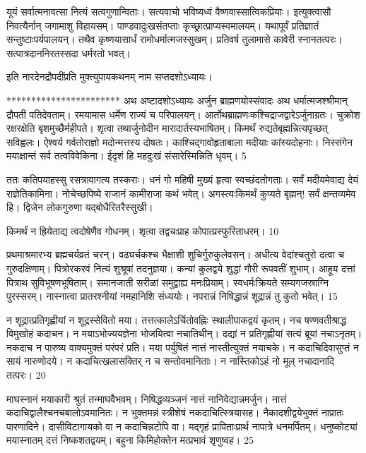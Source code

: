 यूयं सर्वात्मनावत्सा नित्यं सत्वगुणान्विताः।
सत्यवाचो भविष्यध्वं वैष्णवास्सात्विकप्रियाः।
इत्युक्त्वासौ निवत्यैर्नान् जगामाशु विहायसम्।
पाण्डवादुःखसंतप्ताः कृच्छ्रात्प्राप्यस्वमालयम्।
यथापूर्वं प्रतिज्ञातं सन्तुष्टाःपर्यपालयन्।
तथैव कृष्णयासार्धं रामोधर्मात्मजस्सुखम्।
प्रतिवर्ष तुलामासे कावेरी स्नानतत्परः।
सत्पात्रदाननिरतस्सदा धर्मरतो भवत्।

इति नारदेनद्रौपदींप्रति मुक्त्युपायकथनम् नाम
सप्तदशोऽध्यायः।

***********************
अथ अष्टादशोऽध्यायः
अर्जुन ब्राह्मणयोस्संवादः अथ धर्मात्मजश्श्रीमान् द्रौपती पतिदेवताम्।
रमयामास धर्मेण राज्यं च परिपालयन्।
आर्तोथब्राह्मणःकश्चिद्राजद्वारेऽर्जुनाग्रतः।
चुक्रोश रक्षरक्षेति बृशमुच्छैर्महीपते।
शृत्वा तथार्जुनोदीन मारादार्तस्यभाषितम्।
किमर्थं रुद्यतेबृह्मन्नित्यपृच्छत् सविह्वलः।
ऐश्वर्य गर्वतोराज्ञो मदोन्मत्तस्य दोषतः।
काश्चिद्गावोहृताबाला मदीयाः कांस्यदोहनाः।
निस्संगेन मयाक्षान्तं सर्व तत्वविवेकिना।
ईदृशं हि महदुःखं संसारेस्मिन्निति धृवम्।
5

ततः कतिपयाहस्सु रसत्रावागत्य तस्कराः।
धनं गो महिषी मुख्यं हृत्वा स्वच्छंदतोगताः।
सर्वं मदीयमेवाद्य देयं राज्ञेतिकामिना।
नोचेच्छपिष्ये राजानं कामीराजा कथं भवेत्।
अगस्त्यःकिमर्थं कुप्यते बृह्मन्! सर्वं क्षन्तव्यमेव हि।
द्विजेन लोकगुरुणा यद्बोधैरितरैस्सुखी।

किमर्थं न ह्रियेताद्य त्वदोषेणैव गोधनम्।
शृत्वा तद्वचःप्राह कोपात्प्रस्फुरिताधरम्।
10

प्रथमाश्रमारभ्य ब्रह्मचर्यव्रतं चरन्।
वढ्यर्चकश्च भैक्षाशी शुचिर्गुरुकुलेवसन्।
अधीत्य वेदांश्चतुरो दत्वा च गुरुदक्षिणाम्।
पित्रोरकरवं नित्यं शुश्रूषां तदनुज्ञया।
कन्यां कुलद्वये शुद्धां गौरी रूपवतीं शुभाम्।
आहूय दत्तां पित्राथ सुविभूषणभूषिताम्।
समानजाती सरीळां समुद्वाह्य मनःप्रियाम्।
स्वधर्मःक्रियते सम्यगजस्राग्नि पुरस्सरम्।
नास्नात्वा प्रातरश्नीयां नमहानिशि संध्ययोः।
नपरान्नं निषिद्धान्नं शूद्रान्नं तु कुतो भवेत्।
15

न शूद्रात्प्रतिगृह्णीयां न शूद्रस्सेवितो मया।
तत्तत्कालेऽर्चितोवह्निः स्थालीपाकद्वयं कृतम्।
नच षण्णवतीश्राद्ध विमुखोहं कदाचन।
न मयाऽभोज्ययज्ञेना भोजयित्वा नचातिथीन्।
दद्यां न प्रतिगृह्णीयां सत्यं ब्रूयां नचाऽनृतम्।
नकदाच न पारुष्य वाक्यमुक्तं परंपरं प्रति।
मया पर्युषितं नात्तं नास्तीत्युक्तं नयाचके।
न कदाचिदिवासुप्तं न सायं नारुणोदये।
न कदाचित्खलासक्तिर् न च सन्तोवमानिताः।
न नास्तिकोऽहं नो मूल् नचादानादि तत्परः।
20


माघस्नानं मयाकारी श्रुतं तन्माघवैभवम्।
निषिद्धव्यञ्जनं नात्तं नानिवेद्यान्नमर्जुन।
नात्तं कदाचिद्वालैश्चनचबालोऽवमानितः।
न भुक्तमन्नं स्त्रीशेषं नकदाचित्स्त्रियासह।
नैकादशीद्वयेभुक्तं नाप्रातः पारणादिने।
दासीविटागायको वा न कदाचिन्नटोपि वा।
मद्गृहं प्रापिताःप्रार्थ नापात्रे धनमर्पितम्।
धनुष्कोट्यां मयास्नातम् दत्तं निष्कशतद्वयम्।
बहुना किमिहोक्तेन मत्प्रभावं शृणुष्वह।
25

